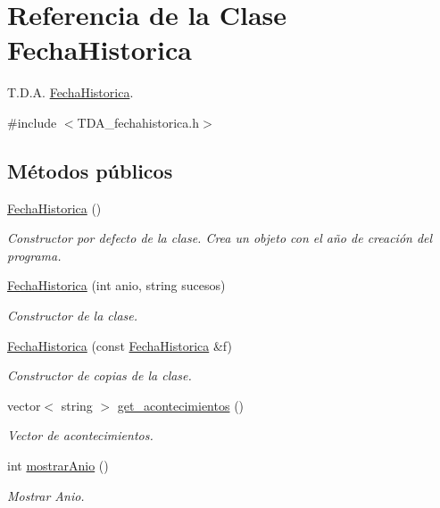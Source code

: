 \hypertarget{classFechaHistorica}{}\section{Referencia de la Clase Fecha\+Historica}
\label{classFechaHistorica}


T.\+D.\+A. \hyperlink{classFechaHistorica}{Fecha\+Historica}.  




{\ttfamily \#include $<$T\+D\+A\+\_\+fechahistorica.\+h$>$}

\subsection*{Métodos públicos}
\begin{DoxyCompactItemize}
\item 
\hyperlink{classFechaHistorica_a35baa09e365240e567049a7e33a7c209}{Fecha\+Historica} ()
\begin{DoxyCompactList}\small\item\em Constructor por defecto de la clase. Crea un objeto con el año de creación del programa. \end{DoxyCompactList}\item 
\hyperlink{classFechaHistorica_a81a9cdafd24a7e649f239754cc6d6317}{Fecha\+Historica} (int anio, string sucesos)
\begin{DoxyCompactList}\small\item\em Constructor de la clase. \end{DoxyCompactList}\item 
\hyperlink{classFechaHistorica_a40a9c133a139d41bf84406e09022feaf}{Fecha\+Historica} (const \hyperlink{classFechaHistorica}{Fecha\+Historica} \&f)
\begin{DoxyCompactList}\small\item\em Constructor de copias de la clase. \end{DoxyCompactList}\item 
vector$<$ string $>$ \hyperlink{classFechaHistorica_a469500ac9ec3ad7ae77cdd9f6b5b3cdc}{get\+\_\+acontecimientos} ()
\begin{DoxyCompactList}\small\item\em Vector de acontecimientos. \end{DoxyCompactList}\item 
int \hyperlink{classFechaHistorica_a8c756f74f70405b5528bf094f8de0cf2}{mostrar\+Anio} ()
\begin{DoxyCompactList}\small\item\em Mostrar Anio. \end{DoxyCompactList}\item 

\end{DoxyCompactItemize}
